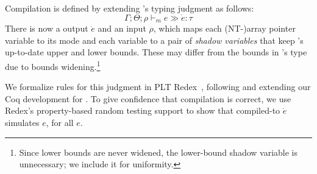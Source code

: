 
Compilation is defined by extending \lang's
typing judgment as follows:
\[\Gamma;\Theta;\rho \vdash_m e \gg \dot e:\tau\]
There is now a \elang output $\dot e$ and an input $\rho$, which maps
each (NT-)array pointer variable to its mode and
each variable  to a pair of \emph{shadow
  variables} that keep 's up-to-date upper and lower bounds. 
These may differ from the bounds in 's type due to bounds
widening.\footnote{Since lower bounds are never widened, the
  lower-bound shadow variable is unnecessary; we include it for uniformity.} 


We formalize rules for this judgment in PLT Redex~\cite{pltredex},
following and extending our Coq development for \lang. To give
confidence that compilation is correct, we use Redex's property-based
random testing support to show that compiled-to $\dot e $ simulates
$e$, for all $e$.

